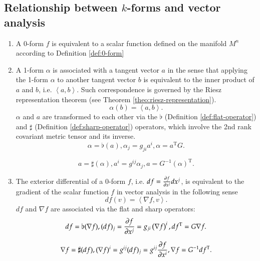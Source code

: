 \documentclass[11pt, a4paper]{book}
\begin{document}
\subsection{Relationship between $k$-forms and vector analysis}

\begin{enumerate}
\item A 0-form $f$ is equivalent to a scalar function defined on the manifold $M^n$ according
  to Definition \ref{def:0-form}
\item A 1-form $\alpha$ is associated with a tangent vector $a$ in the sense that
  applying the 1-form $\alpha$ to another tangent vector $b$ is equivalent to the inner
  product of $a$ and $b$, i.e. $\left\langle a,b \right\rangle$. Such correspondence is
  governed by the Riesz representation theorem (see Theorem \ref{theo:riesz-representation}).
  \begin{equation}
    \alpha(b) = \left\langle a,b \right\rangle.
  \end{equation}
  $\alpha$ and $a$ are transformed to each other via the $\flat$ (Definition
  \ref{def:flat-operator}) and $\sharp$ (Definition \ref{def:sharp-operator}) operators,
  which involve the 2nd rank covariant metric tensor and its inverse.
  \begin{equation}
    \alpha = \flat(a), \alpha_j = g_{ji}a^i, \alpha = a^{\mathrm{T}} G.
  \end{equation}
  
  \begin{equation}
    a = \sharp(\alpha), a^i = g^{ij}\alpha_j, a = G^{-1}(\alpha)^{\mathrm{T}}.
  \end{equation}
\item The exterior differential of a 0-form $f$, i.e.
  $df = \frac{\partial f}{\partial x^j} dx^j$, is equivalent to the gradient of the scalar
  function $f$ in vector analysis in the following sense
  \begin{equation}
    df(v) = \left\langle \nabla f, v \right\rangle.
  \end{equation}
  $df$ and $\nabla f$ are associated via the flat and sharp operators:
  \begin{equation}
    df = \flat(\nabla f), (df)_j = \frac{\partial f}{\partial x^j} = g_{ji} \left( \nabla f
    \right)^i, df^{\mathrm{T}} = G\nabla f.
  \end{equation}

  \begin{equation}
    \label{eq:1-form-to-gradient}
    \nabla f = \sharp(df), (\nabla f)^i = g^{ij} (df)_j = g^{ij} \frac{\partial f}{\partial
      x^{i}}, \nabla f = G^{-1} df^{\mathrm{T}}.
  \end{equation}


\end{enumerate}
\end{document}
